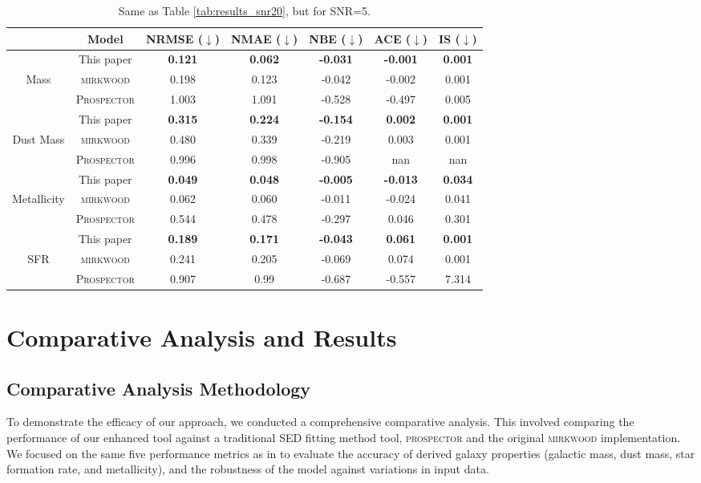 \documentclass[letterpaper]{article}
\begin{document}
\begin{table*}
\centering
\begin{tabular}{ccccccc}
\toprule
\toprule
& Model &  NRMSE ($\downarrow$) & NMAE ($\downarrow$) & NBE ($\downarrow$) & ACE ($\downarrow$) & IS ($\downarrow$) \\ \midrule
& This paper  &  \textbf{0.121}&  \textbf{0.062}&  \textbf{-0.031}&  \textbf{-0.001}&  \textbf{0.001} \\
Mass & \textsc{mirkwood} &    0.198 &  0.123 &  -0.042 &  -0.002&  0.001 \\
& \textsc{Prospector} &  1.003 &  1.091 &  -0.528 &   -0.497  &  0.005 \\ \midrule
& This paper  &    \textbf{0.315}&   \textbf{0.224}&  \textbf{-0.154}&   \textbf{0.002}&  \textbf{0.001}\\
Dust Mass & \textsc{mirkwood} &  0.480&  0.339 &  -0.219 &  0.003 & 0.001 \\
& \textsc{Prospector} &  0.996 &  0.998 & -0.905 &  nan &  nan \\ \midrule
& This paper&  \textbf{0.049}&   \textbf{0.048}&  \textbf{-0.005}&  \textbf{-0.013}&  \textbf{0.034}\\
Metallicity & \textsc{mirkwood}&  0.062&  0.060&   -0.011&  -0.024&  0.041\\
& \textsc{Prospector}&  0.544&  0.478&   -0.297&  0.046&  0.301\\ \midrule
& This paper&  \textbf{0.189}&   \textbf{0.171}&  \textbf{-0.043}&  \textbf{0.061}&  \textbf{0.001}\\
SFR & \textsc{mirkwood}&   0.241&  0.205&   -0.069&  0.074&  0.001\\
& \textsc{Prospector}&  0.907&  0.99&   -0.687&  -0.557&    7.314\\ \bottomrule
\end{tabular}
\caption{Same as Table \ref{tab:results_snr20}, but for SNR=5.}
\label{tab:results_snr5}
\end{table*}


\section{Comparative Analysis and Results}

\subsection{Comparative Analysis Methodology}
To demonstrate the efficacy of our approach, we conducted a comprehensive comparative analysis. This involved comparing the performance of our enhanced tool against a traditional SED fitting method tool, \textsc{prospector} \cite{2019ascl.soft05025J} and the original \textsc{mirkwood} implementation. We focused on the same five performance metrics as in \citet{Gilda21} to evaluate the accuracy of derived galaxy properties (galactic mass, dust mass, star formation rate, and metallicity), and the robustness of the model against variations in input data.
\end{document}
